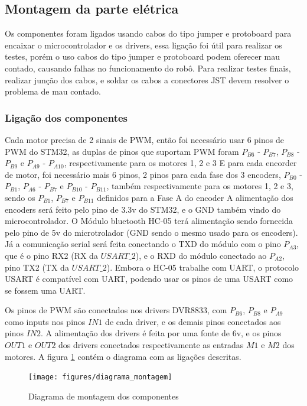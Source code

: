 	\subsection{Montagem da parte elétrica}

	Os componentes foram ligados usando cabos do tipo jumper e protoboard para encaixar o microcontrolador e os drivers,
	essa ligação foi útil para realizar os testes, porém o uso cabos do tipo jumper e protoboard podem oferecer mau contado, causando falhas no funcionamento do robô.
	Para realizar testes finais, realizar junção dos cabos, e soldar os cabos a conectores JST devem resolver o problema de mau contado.
	
	
	\subsubsection{Ligação dos componentes}
	Cada motor precisa de 2 sinais de PWM, então foi necessário usar 6 pinos de PWM do STM32, as duplas de pinos que suportam PWM foram $P_{B6}$ - $P_{B7}$, $P_{B8}$ - $P_{B9}$ e $P_{A9}$ - $P_{A10}$, respectivamente para os motores 1, 2 e 3
	E para cada encorder de motor, foi necessário mais 6 pinos, 2 pinos para cada fase dos 3 encoders, $P_{B0}$ - $P_{B1}$, $P_{A6}$ - $P_{B7}$ e $P_{B10}$ - $P_{B11}$, também respectivamente para os motores 1, 2 e 3, sendo os  $P_{B1}$, $P_{B7}$ e $P_{B11}$ definidos para a Fase A do encoder
	A alimentação dos encoders será feito pelo pino de 3.3v do STM32, e o GND também vindo do microcontrolador.
	O Módulo bluetooth HC-05 terá alimentação sendo fornecida pelo pino de 5v do microtrolador (GND sendo o mesmo usado para os encoders).
	Já a comunicação serial será feita conectando o TXD do módulo com o pino $P_{A3}$, que é o pino RX2 (RX da $USART\_2$), e o RXD do módulo conectado ao $P_{A2}$, pino TX2 (TX da $USART\_2$).
	Embora o HC-05 trabalhe com UART, o protocolo USART é compatível com UART, podendo usar os pinos de uma USART como se fossem uma UART.
	
	Os pinos de PWM são conectados nos drivers DVR8833, com  $P_{B6}$, $P_{B8}$ e $P_{A9}$ como inputs nos pinos $IN1$ de cada driver, e os demais pinos conectados aos pinos $IN2$.
	A alimentação dos drivers é feita por uma fonte de 6v, e os pinos $OUT1$ e $OUT2$ dos drivers conectados respectivamente as entradas $M1$ e $M2$ dos motores. A figura \ref{fig:diagrama_montagem} contém o diagrama com as ligações descritas.
	
	\begin{figure}[htb]
		\centering
		\texttt{[image: figures/diagrama\_montagem]}
		\caption{Diagrama de montagem dos componentes}
		\label{fig:diagrama_montagem}
	\end{figure}
	
